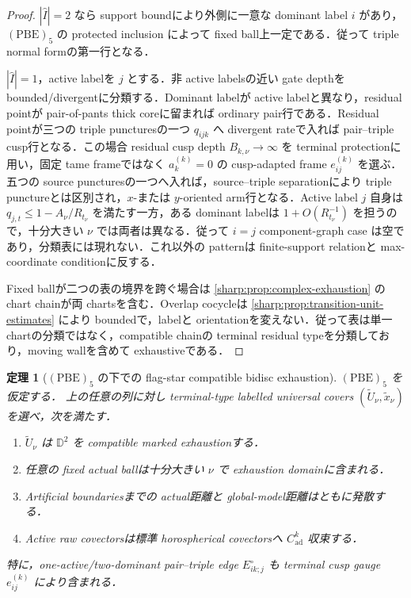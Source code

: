\documentclass[a4paper,11pt]{ltjsarticle}
\numberwithin{equation}{section}
\theoremstyle{plain}
\newtheorem{theorem}{定理}[section]
\theoremstyle{definition}
\theoremstyle{remark}
\begin{document}
\begin{proof}
$|\widehat I|=2$ なら support boundにより外側に一意な dominant label $i$ があり，$\mathrm{(PBE)}_5$ の protected inclusion によって fixed ball上一定である．従って triple normal formの第一行となる．

$|\widehat I|=1$，active labelを $j$ とする．非 active labelsの近い gate depthを bounded/divergentに分類する．Dominant labelが active labelと異なり，residual pointが pair-of-pants thick coreに留まれば ordinary pair行である．Residual pointが三つの triple puncturesの一つ $q_{ijk}$ へ divergent rateで入れば pair--triple cusp行となる．この場合 residual cusp depth $B_{k,\nu}\to\infty$ を terminal protectionに用い，固定 tame frameではなく $a_k^{(k)}=0$ の cusp-adapted frame $e^{(k)}_{ij}$ を選ぶ．五つの source puncturesの一つへ入れば，source--triple separationにより triple punctureとは区別され，$x$-または $y$-oriented arm行となる．Active label $j$ 自身は $q_{j,t}\le1-A_\nu/R_{t_\nu}$ を満たす一方，ある dominant labelは $1+O(R_{t_\nu}^{-1})$ を担うので，十分大きい $\nu$ では両者は異なる．従って $i=j$ component-graph case は空であり，分類表には現れない．これ以外の patternは finite-support relationと max-coordinate conditionに反する．

Fixed ballが二つの表の境界を跨ぐ場合は \cref{sharp:prop:complex-exhaustion} の chart chainが両 chartsを含む．Overlap cocycleは \cref{sharp:prop:transition-unit-estimates} により boundedで，labelと orientationを変えない．従って表は単一 chartの分類ではなく，compatible chainの terminal residual typeを分類しており，moving wallを含めて exhaustiveである．
\end{proof}

\begin{theorem}[$\mathrm{(PBE)}_5$ の下での flag-star compatible bidisc exhaustion]\label{sharp:thm:flag-star-compatible-exhaustion}
$\mathrm{(PBE)}_5$ を仮定する．
上の任意の列に対し terminal-type labelled universal covers $(\widetilde U_\nu,\tilde x_\nu)$ を選べ，次を満たす．
\begin{enumerate}[label=\textup{(F\arabic*)}]
\item $\widetilde U_\nu$ は $\mathbb D^2$ を compatible marked exhaustionする．
\item 任意の fixed actual ballは十分大きい $\nu$ で exhaustion domainに含まれる．
\item Artificial boundariesまでの actual距離と global-model距離はともに発散する．
\item Active raw covectorsは標準 horospherical covectorsへ $C^k_{\mathrm{ad}}$ 収束する．
\end{enumerate}
特に，one-active/two-dominant pair--triple edge $E_{ik;j}^{\circ}$ も terminal cusp gauge $e^{(k)}_{ij}$ により含まれる．
\end{theorem}
\end{document}

